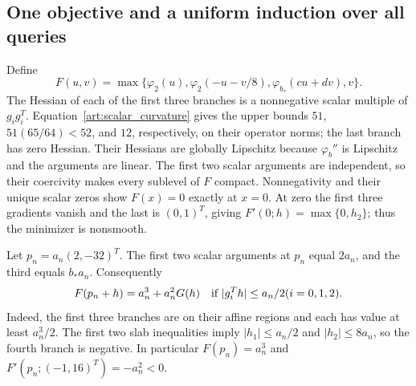 \subsection{One objective and a uniform induction over all queries}
Define
\begin{equation}\label{art:upper_objective}
 F(u,v)=\max\{\varphi_2(u),\varphi_2(-u-v/8),
                    \varphi_{b_*}(cu+dv),v\}.
\end{equation}
The Hessian of each of the first three branches is a nonnegative scalar
multiple of $g_ig_i^T$. Equation~\eqref{art:scalar_curvature} gives the
upper bounds $51$, $51(65/64)<52$, and $12$, respectively, on their
operator norms; the last branch has zero Hessian. Their Hessians are
globally Lipschitz because $\varphi_b''$ is Lipschitz and the arguments
are linear. The first two scalar arguments are independent, so their
coercivity makes every sublevel of $F$ compact. Nonnegativity and their
unique scalar zeros show $F(x)=0$ exactly at $x=0$. At zero the first
three gradients vanish and the last is $(0,1)^T$, giving
$F'(0;h)=\max\{0,h_2\}$; thus the minimizer is nonsmooth.

Let $p_n=a_n(2,-32)^T$. The first two scalar arguments at $p_n$ equal
$2a_n$, and the third equals $b_*a_n$. Consequently
\begin{equation}\label{art:upper_local_model}
 F(p_n+h)=a_n^3+a_n^2G(h)
 \quad\hbox{if } |g_i^Th|\le a_n/2 (i=0,1,2).
\end{equation}
Indeed, the first three branches are on their affine regions and each
has value at least $a_n^3/2$. The first two slab inequalities imply
$|h_1|\le a_n/2$ and $|h_2|\le8a_n$, so the fourth branch is negative.
In particular $F(p_n)=a_n^3$ and
$F'(p_n;(-1,16)^T)=-a_n^2<0$.


